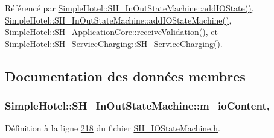 Référencé par \hyperlink{classSimpleHotel_1_1SH__InOutStateMachine_a07ae9f1f74a9a41b26e77a014679a33e}{Simple\-Hotel\-::\-S\-H\-\_\-\-In\-Out\-State\-Machine\-::add\-I\-O\-State()}, \hyperlink{classSimpleHotel_1_1SH__InOutStateMachine_a27a59a44e0bcddf90d40b38788bb38f4}{Simple\-Hotel\-::\-S\-H\-\_\-\-In\-Out\-State\-Machine\-::add\-I\-O\-State\-Machine()}, \hyperlink{classSimpleHotel_1_1SH__ApplicationCore_ae597b1ac2cc9efb4fe0a61df806bd81a}{Simple\-Hotel\-::\-S\-H\-\_\-\-Application\-Core\-::receive\-Validation()}, et \hyperlink{classSimpleHotel_1_1SH__ServiceCharging_ae82c86c7e955f0dc93cdfc3603789b87}{Simple\-Hotel\-::\-S\-H\-\_\-\-Service\-Charging\-::\-S\-H\-\_\-\-Service\-Charging()}.



\subsection{Documentation des données membres}
\hypertarget{classSimpleHotel_1_1SH__InOutStateMachine_a4b0a3a48b0da31fddb724a357ad9b52c}{
\subsubsection[{m\-\_\-io\-Content}]{\setlength{\rightskip}{0pt plus 5cm}Simple\-Hotel\-::\-S\-H\-\_\-\-In\-Out\-State\-Machine\-::m\-\_\-io\-Content\hspace{0.3cm}{\ttfamily [protected]}, {\ttfamily [inherited]}}}\label{classSimpleHotel_1_1SH__InOutStateMachine_a4b0a3a48b0da31fddb724a357ad9b52c}


Définition à la ligne \hyperlink{SH__IOStateMachine_8h_source_l00218}{218} du fichier \hyperlink{SH__IOStateMachine_8h_source}{S\-H\-\_\-\-I\-O\-State\-Machine.\-h}.



